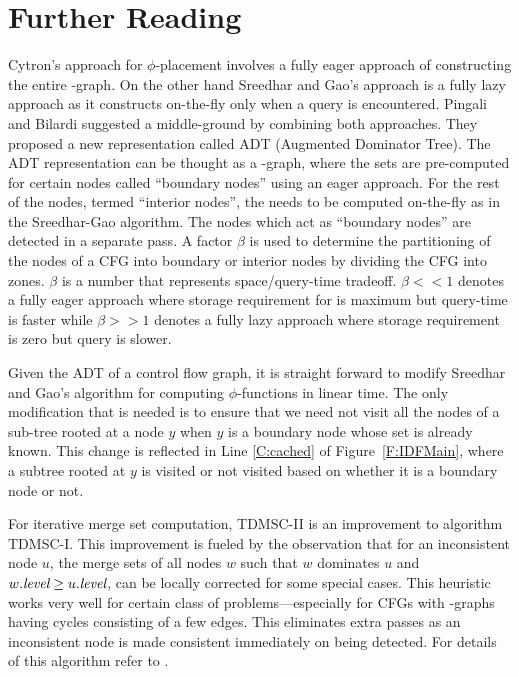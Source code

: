 {\section{Further Reading}
Cytron's approach for $\phi$-placement involves a fully eager approach of constructing the entire \DF-graph. On the other hand Sreedhar and Gao's approach is a fully lazy approach as it constructs \DF on-the-fly only when a query is encountered.
Pingali and Bilardi \cite{bilardi} suggested a middle-ground by combining both approaches. They proposed a new representation called ADT (Augmented Dominator Tree). The ADT representation can be thought as a \DJ-graph, where the \DF sets are pre-computed for certain nodes called ``boundary nodes'' using an eager approach. For the rest of the nodes, termed ``interior nodes'', the \DF needs to be computed on-the-fly as in the Sreedhar-Gao algorithm. The nodes which act as ``boundary nodes'' are detected in a separate pass. A factor $\beta$ is used to determine the partitioning of the nodes of a CFG into boundary or interior nodes by dividing the CFG into zones. $\beta$ is a number that represents space/query-time tradeoff. $\beta << 1$ denotes a fully eager approach where storage requirement for \DF is maximum but query-time is faster while $\beta >> 1$ denotes a fully lazy approach where storage requirement is zero but query is slower. 

Given the ADT of a control flow graph, it is straight forward to 
modify  Sreedhar and Gao's algorithm for computing $\phi$-functions in linear time. The only modification that is needed is to ensure that we need not visit all the nodes of a sub-tree rooted at a node $y$ when $y$ is a boundary node whose \DF set is already known. This change is reflected in Line \ref{C:cached} of Figure~\ref{F:IDFMain}, where a subtree rooted at $y$ is visited or not visited based on whether it is a boundary node or not.

For iterative merge set computation, TDMSC-II is an improvement to algorithm 
TDMSC-I. This improvement is fueled by the observation that for an inconsistent 
node $u$, the merge sets of all nodes $w$ such that $w$ dominates $u$ and 
$w.\textit{level} \geq u.\textit{level}$,
can be locally corrected for some special cases. This
heuristic works very well for certain class of problems---especially for CFGs with \DF-graphs having cycles consisting of a few edges. This eliminates extra passes as an inconsistent node is made consistent immediately on being detected. For details of this algorithm refer to \cite{das}.


}
